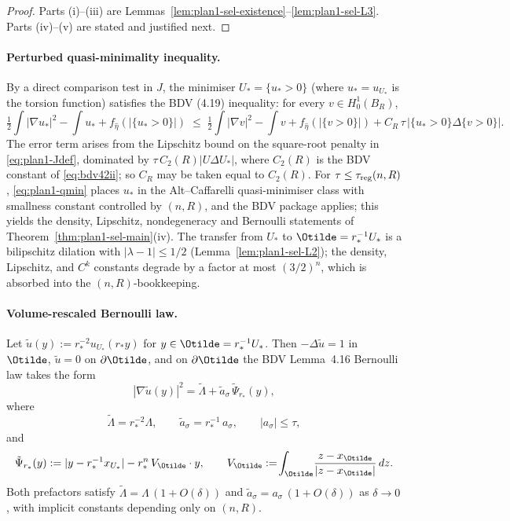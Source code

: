 \begin{proof}
Parts (i)--(iii) are
Lemmas~\ref{lem:plan1-sel-existence}--\ref{lem:plan1-sel-L3}.
Parts (iv)--(v) are stated and justified next.
\end{proof}

\paragraph{Perturbed quasi-minimality inequality.}
By a direct comparison test in $J$, the minimiser $U_*=\{u_*>0\}$ (where
$u_*=u_{U_*}$ is the torsion function) satisfies the BDV (4.19)
inequality: for every $v\in H^1_0(B_R)$,
\begin{equation}\label{eq:plan1-qmin}
\tfrac12\!\int|\nabla u_*|^2-\!\int u_*
+f_{\hat\eta}(|\{u_*>0\}|)
\;\le\;\tfrac12\!\int|\nabla v|^2-\!\int v+f_{\hat\eta}(|\{v>0\}|)
+C_R\,\tau\,\bigl|\{u_*>0\}\Delta\{v>0\}\bigr|.
\end{equation}
The error term arises from the Lipschitz bound on the square-root
penalty in \eqref{eq:plan1-Jdef}, dominated by
$\tau\,C_2(R)|U\Delta U_*|$, where $C_2(R)$ is the BDV
constant of \eqref{eq:bdv42ii}; so $C_R$ may be taken equal to
$C_2(R)$. For $\tau\le\tau_{\rm reg}(n,R)$,
\eqref{eq:plan1-qmin} places $u_*$ in the
Alt--Caffarelli quasi-minimiser class with smallness constant
controlled by $(n,R)$, and the BDV
package \cite[Lemmas~4.9, 4.11, 4.12, 4.16]{BDV} applies; this yields
the density, Lipschitz, nondegeneracy and Bernoulli statements of
Theorem~\ref{thm:plan1-sel-main}(iv). The transfer from $U_*$ to
$\Otilde=r_*^{-1}U_*$ is a bilipschitz dilation with
$|\lambda-1|\le 1/2$ (Lemma~\ref{lem:plan1-sel-L2}); the density,
Lipschitz, and $C^{k}$ constants degrade by a factor at most
$(3/2)^{n}$, which is absorbed into the $(n,R)$-bookkeeping.

\paragraph{Volume-rescaled Bernoulli law.}

\begin{lemma}
\label{lem:plan1-sel-bern}
Let $\tilde u(y):=r_*^{-2}u_{U_*}(r_*y)$ for $y\in\Otilde=r_*^{-1}U_*$.
Then $-\Delta\tilde u=1$ in $\Otilde$, $\tilde u=0$ on $\partial\Otilde$,
and on $\partial\Otilde$ the BDV Lemma~4.16 Bernoulli law takes the form
\begin{equation}\label{eq:plan1-Berntilde}
|\nabla\tilde u(y)|^2
=\tilde\Lambda
+\tilde a_\sigma\,\tilde\Psi_{r_*}(y),
\end{equation}
where
\begin{equation}\label{eq:plan1-Berncoeff}
\tilde\Lambda=r_*^{-2}\Lambda,
\qquad
\tilde a_\sigma=r_*^{-1}\,a_\sigma,
\qquad
|a_\sigma|\le \tau,
\end{equation}
and
\[
\tilde\Psi_{r_*}(y)
:=|y-r_*^{-1}x_{U_*}|-r_*^{n}\,V_{\Otilde}\cdot y,
\qquad
V_{\Otilde}:=\!\int_{\Otilde}\!\frac{z-x_{\Otilde}}{|z-x_{\Otilde}|}\,dz.
\]
Both prefactors satisfy
$\tilde\Lambda=\Lambda\,(1+O(\delta))$ and
$\tilde a_\sigma=a_\sigma\,(1+O(\delta))$ as $\delta\to0$, with
implicit constants depending only on $(n,R)$.
\end{lemma}

